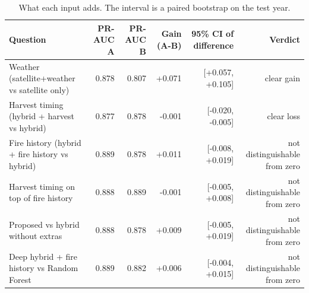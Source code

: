 \begin{table}[t]
\centering
\caption{What each input adds. The interval is a paired bootstrap on the test year.}
\label{tab:table3_ablation}
\begin{tabular}{lrrrrr}
\hline
Question & PR-AUC A & PR-AUC B & Gain (A-B) & 95\% CI of difference & Verdict \\
\hline
Weather (satellite+weather vs satellite only) & 0.878 & 0.807 & +0.071 & [+0.057, +0.105] & clear gain \\
Harvest timing (hybrid + harvest vs hybrid) & 0.877 & 0.878 & -0.001 & [-0.020, -0.005] & clear loss \\
Fire history (hybrid + fire history vs hybrid) & 0.889 & 0.878 & +0.011 & [-0.008, +0.019] & not distinguishable from zero \\
Harvest timing on top of fire history & 0.888 & 0.889 & -0.001 & [-0.005, +0.008] & not distinguishable from zero \\
Proposed vs hybrid without extras & 0.888 & 0.878 & +0.009 & [-0.005, +0.019] & not distinguishable from zero \\
Deep hybrid + fire history vs Random Forest & 0.889 & 0.882 & +0.006 & [-0.004, +0.015] & not distinguishable from zero \\
\hline
\end{tabular}
\end{table}
